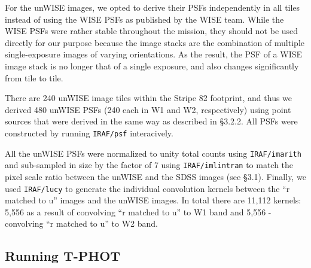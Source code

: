 \documentclass[apj,iop]{emulateapj}
\begin{document}
For the unWISE images, we opted to derive their PSFs independently in all tiles instead of using the WISE PSFs as published by the WISE team. While the WISE PSFs were rather stable throughout the mission, they should not be used directly for our purpose because the image stacks are the combination of multiple single-exposure images of varying orientations. As the result, the PSF of a WISE image stack is no longer that of a single exposure, and also changes significantly from tile to tile. 

There are 240 unWISE image tiles within the Stripe 82 footprint, and thus we derived 480 unWISE PSFs (240 each in W1 and W2, respectively) using point sources that were derived in the same way as described in \S 3.2.2. All PSFs were constructed by running {\tt IRAF/psf} interacively.

All the unWISE PSFs were normalized to unity total counts using {\tt IRAF/imarith} and sub-sampled in size by the factor of 7 using {\tt IRAF/imlintran} to match the pixel scale ratio between the unWISE and the SDSS images (see \S 3.1). %
Finally, we used {\tt IRAF/lucy} to generate the individual convolution kernels between the ``r matched to u'' images and the unWISE images. In total there are 11,112 kernels: 5,556 as a result of convolving ``r matched to u'' to W1 band and 5,556 - convolving ``r matched to u'' to W2 band.

\subsection{Running T-PHOT}

\end{document}
